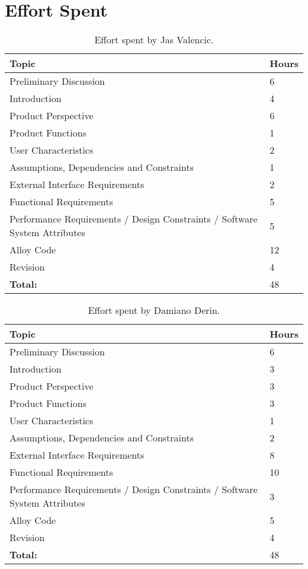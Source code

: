 \chapter{Effort Spent}

\begin{table}[H]
\centering
\begin{tabular}{| m{} | m{} |} 
	\hline
		\textbf{Topic} & \textbf{Hours} \\
		\hline
		Preliminary Discussion & 6 \\
		\hline
		Introduction & 4 \\
		\hline
		Product Perspective & 6 \\
		\hline
		Product Functions & 1\\
		\hline
		User Characteristics & 2 \\
		\hline
		Assumptions, Dependencies and Constraints & 1 \\
		\hline
		External Interface Requirements & 2 \\
		\hline
		Functional Requirements & 5 \\
		\hline
		Performance Requirements / Design Constraints / Software System Attributes & 5 \\
		\hline
		Alloy Code & 12 \\ 
		\hline
		Revision & 4 \\ 
		\hline
		\hline
		\textbf{Total:} & 48 \\
	\hline
\end{tabular}
\caption{Effort spent by Jas Valencic.}
\end{table}

\begin{table}[H]
\centering
\begin{tabular}{| m{} | m{} |} 
	\hline
		\textbf{Topic} & \textbf{Hours} \\
		\hline
		Preliminary Discussion & 6 \\
		\hline
		Introduction & 3 \\
		\hline
		Product Perspective & 3 \\
		\hline
		Product Functions & 3 \\
		\hline
		User Characteristics & 1 \\
		\hline
		Assumptions, Dependencies and Constraints & 2 \\
		\hline
		External Interface Requirements & 8 \\
		\hline
		Functional Requirements & 10 \\
		\hline
		Performance Requirements / Design Constraints / Software System Attributes & 3 \\
		\hline
		Alloy Code & 5 \\ 
		\hline
		Revision & 4 \\ 
		\hline
		\hline
		\textbf{Total:} & 48 \\
	\hline
\end{tabular}
\caption{Effort spent by Damiano Derin.}
\end{table}